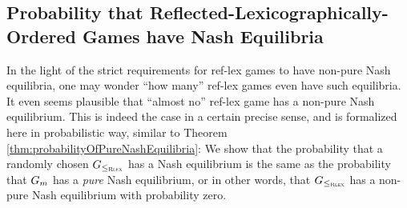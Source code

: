 \documentclass[a4paper]{scrreprt}
\theoremstyle{definition}
\begin{document}
    
    \subsection{Probability that Reflected-Lexicographically-Ordered Games have Nash Equilibria}
    
    In the light of the strict requirements for ref-lex games to have non-pure Nash equilibria, one may wonder “how many” ref-lex games even have such equilibria. 
    It even seems plausible that “almost no” ref-lex game has a non-pure Nash equilibrium.
    This is indeed the case in a certain precise sense, and is formalized here in probabilistic way, similar to Theorem \ref{thm:probabilityOfPureNashEquilibria}:
    We show that the probability that a randomly chosen $G_{\leq_{\textsc{Rlex}}}$ has a Nash equilibrium is the same as the probability that $G_{m}$ has a \emph{pure} Nash equilibrium, or in other words, that $G_{\leq_{\textsc{Rlex}}}$ has a non-pure Nash equilibrium with probability zero.
    
\end{document}
